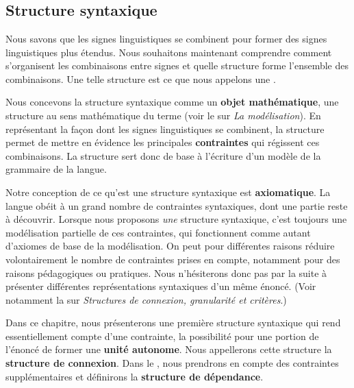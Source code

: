 \chapter{}\label{sec:3.2}

\section{Structure syntaxique}\label{sec:3.2.0}

Nous savons que les signes linguistiques se combinent pour former des signes linguistiques plus étendus. Nous souhaitons maintenant comprendre comment s’organisent les combinaisons entre signes et quelle structure forme l’ensemble des combinaisons. Une telle structure est ce que nous appelons une .

Nous concevons la structure syntaxique comme un \textbf{objet mathématique}, une structure au sens mathématique du terme (voir le  sur \textit{La modélisation}). En représentant la façon dont les signes linguistiques se combinent, la structure permet de mettre en évidence les principales \textbf{contraintes} qui régissent ces combinaisons. La structure sert donc de base à l’écriture d’un modèle de la grammaire de la langue.

Notre conception de ce qu’est une structure syntaxique est \textbf{axiomatique}. La langue obéit à un grand nombre de contraintes syntaxiques, dont une partie reste à découvrir. Lorsque nous proposons \textit{une} structure syntaxique, c’est toujours une modélisation partielle de ces contraintes, qui fonctionnent comme autant d’axiomes de base de la modélisation. On peut pour différentes raisons réduire volontairement le nombre de contraintes prises en compte, notamment pour des raisons pédagogiques ou pratiques. Nous n’hésiterons donc pas par la suite à présenter différentes représentations syntaxiques d’un même énoncé. (Voir notamment la  sur \textit{Structures de connexion, granularité et critères}.)

Dans ce chapitre, nous présenterons une première structure syntaxique qui rend essentiellement compte d’une contrainte, la possibilité pour une portion de l’énoncé de former une \textbf{unité autonome}. Nous appellerons cette structure la \textbf{structure de connexion}. Dans le , nous prendrons en compte des contraintes supplémentaires et définirons la \textbf{structure de dépendance}.


